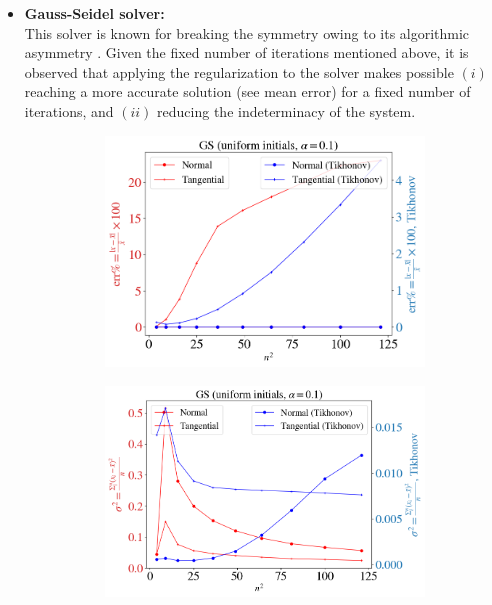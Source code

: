 \begin{itemize}
	\item 	\textbf{Gauss-Seidel solver:}\\
	This solver is known for breaking the symmetry owing to its algorithmic asymmetry \cite{smithImpact2012}. Given the fixed number of iterations mentioned above, it is observed that applying the regularization to the solver makes possible $(i)$ reaching a more accurate solution (see mean error) for a fixed number of iterations, and $(ii)$ reducing the indeterminacy of the system. 
	\begin{figure}[H]
		\centering	
		\begin{subfigure}{0.43\columnwidth}	
			\centering
			\includegraphics[width=1.0\textwidth]{images/CD/GS_u_mean.png}
		\end{subfigure}
		\begin{subfigure}{0.47\columnwidth}	
			\centering
			\includegraphics[width=1.0\textwidth]{images/CD/GS_u_std.png}

\end{subfigure}
\end{figure}
\end{itemize}
